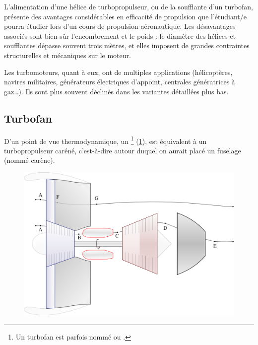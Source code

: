 		L’alimentation d’une hélice de turbopropulseur, ou de la soufflante d’un turbofan, présente des avantages considérables en efficacité de propulsion que l’étudiant/e pourra étudier lors d’un cours de propulsion aéronautique. Les désavantages associés sont bien sûr l’encombrement et le poids : le diamètre des hélices et soufflantes dépasse souvent trois mètres, et elles imposent de grandes contraintes structurelles et mécaniques sur le moteur.

		Les turbomoteurs, quant à eux, ont de multiples applications (hélicoptères, navires militaires, générateurs électriques d’appoint, centrales génératrices à gaz…). Ils sont plus souvent déclinés dans les variantes détaillées plus bas.


	\subsection{Turbofan}

		D’un point de vue thermodynamique, un \footnote{Un turbofan est parfois nommé  ou .} (\cref{fig_turbofan}), est équivalent à un turbopropulseur caréné, c’est-à-dire autour duquel on aurait placé un fuselage (nommé carène).
		
		\begin{figure}
			\begin{center}
				\includegraphics[scale=0.6]{images/circuit_turbofan.png}
			\end{center}
			\label{fig_turbofan}
		\end{figure}
		
